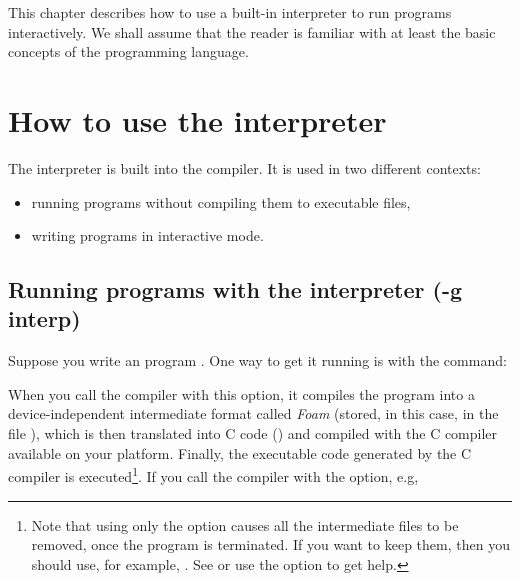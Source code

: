 

This chapter describes how to use a built-in interpreter to run 
\asharp{} programs interactively.  We shall assume that the reader is
familiar with at least the basic concepts of the \asharp{} programming
language.

\section{How to use the interpreter}

The interpreter is built into the \asharp{} compiler.
It is used in two different contexts:

\begin{itemize}
\item running \asharp{} programs without compiling them to executable
files,
\item writing \asharp{} programs in interactive mode.
\end{itemize}

\subsection{Running programs with the interpreter (-g interp)}

Suppose you write an \asharp{} program . One way to get it
running is with the command:

\begin{small}
\osprompt {}
\end{small}

When you call the compiler with this option, it compiles the program
into a device-independent intermediate format called {\em Foam}
(stored, in this case, in the file
), which is then translated into C code ()
and compiled with the C compiler available on your platform.
Finally, the executable code generated by the C
compiler is executed\footnote{Note that using only the option
 causes all the intermediate files to be removed, once
the program is terminated. If you
want to keep them, then you should use, for example, .
See  or use the
 option to get help.}.
If you call the compiler with the  option, e.g,

